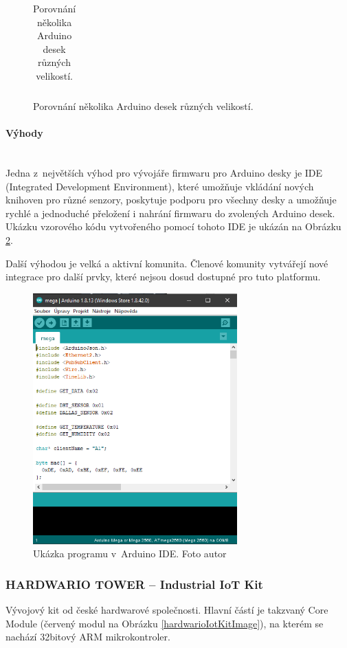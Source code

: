 \begin{figure}[H]
\begin{table}[H]
\begin{tabular}{|l|l|l|l|l|l|l|l|}
    \hline
    \end{tabular}
    \caption{Porovnání několika Arduino desek různých velikostí.\cite{Arduino-comparison}}
    \label{arduino-table}
  \end{table}
\end{figure}

\paragraph*{Výhody}\mbox{} \\
Jedna z~největších výhod pro vývojáře firmwaru pro Arduino desky je IDE (Integrated Development Environment), které umožňuje vkládání nových knihoven pro různé senzory, poskytuje podporu pro všechny desky a umožňuje rychlé a jednoduché přeložení i nahrání firmwaru do zvolených Arduino desek. Ukázku vzorového kódu vytvořeného pomocí tohoto IDE je ukázán na Obrázku \ref{arduinoIdeExample}.

Další výhodou je velká a aktivní komunita. Členové komunity vytvářejí nové integrace pro další prvky, které nejsou dosud dostupné pro tuto platformu.

\begin{figure}[H]
  \centering
  \includegraphics[width=0.7\textwidth]{obrazky-figures/smartHomeHardware/arduinoIDE.png}
  \caption{Ukázka programu v~Arduino IDE. Foto autor}
  \label{arduinoIdeExample}
\end{figure}

\subsubsection*{HARDWARIO TOWER – Industrial IoT Kit}
Vývojový kit od české hardwarové společnosti. Hlavní částí je takzvaný Core Module (červený modul na Obrázku \ref{hardwarioIotKitImage}), na kterém se nachází 32bitový ARM mikrokontroler. 

